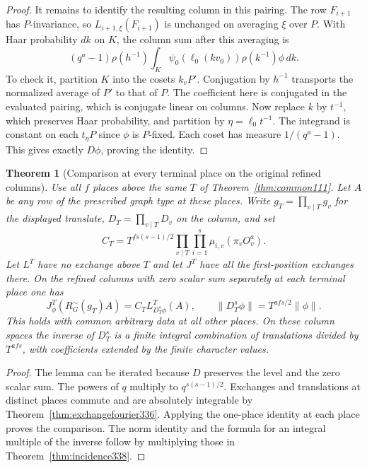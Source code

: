 \documentclass[a4paper,11pt]{article}
\newtheorem{theorem}[proposition]{Theorem}
\theoremstyle{definition}
\theoremstyle{remark}
\numberwithin{equation}{section}
\begin{document}
\begin{proof}
It remains to identify the resulting column in this pairing.
The row \(F_{i+1}\) has \(P\)-invariance, so \(L_{i+1,\xi}(F_{i+1})\)
is unchanged on averaging \(\xi\) over \(P\). With Haar probability
\(dk\) on \(K\), the column sum after this averaging is
\[
 (q^a-1)\rho(h^{-1})
       \int_K\psi_0(\ell_0(kv_0))\rho(k^{-1})\phi\,dk .
\]
To check it, partition \(K\) into the cosets \(k_vP'\).
Conjugation by \(h^{-1}\) transports the normalized average of
\(P'\) to that of \(P\). The coefficient here is conjugated in
the evaluated pairing, which is conjugate linear on columns.
Now replace \(k\) by \(t^{-1}\), which preserves Haar probability,
and partition by \(\eta=\ell_0 t^{-1}\). The integrand is constant
on each \(t_\eta P\) since \(\phi\) is \(P\)-fixed. Each coset has
measure \(1/(q^a-1)\). This gives exactly \(D\phi\), proving the identity.
\end{proof}

\begin{theorem}[Comparison at every terminal place on the original refined columns]\label{thm:terminalwalk338}
Use all \(f\) places above the same \(T\) of Theorem~\ref{thm:common111}.
Let \(A\) be any row of the prescribed graph type at these places.
Write \(g_T=\prod_{v\mid T}g_v\) for the displayed translate,
\(D_T=\prod_{v\mid T}D_v\) on the column, and set
\[
 C_T= T^{fs(s-1)/2}
                 \prod_{v\mid T}\prod_{i=1}^s\mu_{i,v}(\pi_v O_v^a).
\]
Let \(L^T\) have no exchange above \(T\) and let \(J^T\) have
all the first-position exchanges there. On the refined columns
with zero scalar sum separately at each terminal place one has
\[
 J^T_\phi(R_G^\sim(g_T)A)= C_T L^T_{D_T^s\phi}(A),
       \qquad \|D_T^s\phi\|=T^{afs/2}\|\phi\|.
\]
This holds with common arbitrary data at all other places. On
these column spaces the inverse of \(D_T^s\) is a finite integral
combination of translations divided by \(T^{afs}\), with
coefficients extended by the finite character values.
\end{theorem}
\begin{proof}
The lemma can be iterated because \(D\) preserves the level and the
zero scalar sum. The powers of \(q\) multiply to \(q^{s(s-1)/2}\).
Exchanges and translations at distinct places commute and are
absolutely integrable by Theorem~\ref{thm:exchangefourier336}.
Applying the one-place identity at each place proves the comparison.
The norm identity and the formula for an integral multiple of the
inverse follow by multiplying those in Theorem~\ref{thm:incidence338}.
\end{proof}
\end{document}

